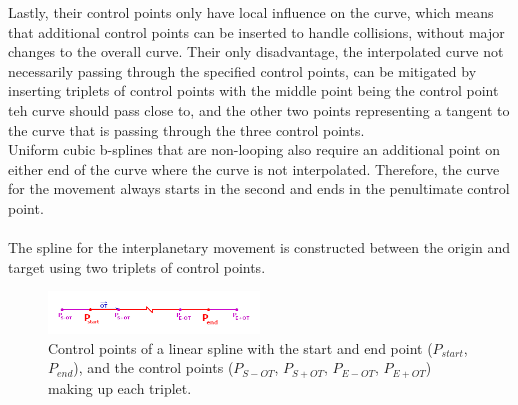 Lastly, their control points only have local influence on the curve, which means that additional control points can
be inserted to handle collisions, without major changes to the overall curve.
Their only disadvantage, the interpolated curve not necessarily passing through the specified control points, can be
mitigated by inserting triplets of control points with the middle point being the control point teh curve should pass
close to, and the other two points representing a tangent to the curve that is passing through the three control points.
\\
Uniform cubic b-splines that are non-looping also require an additional point on either end of the curve where the
curve is not interpolated.
Therefore, the curve for the movement always starts in the second and ends in the penultimate control point.
\\
\\
The spline for the interplanetary movement is constructed between the origin and target using two triplets of control
points.

\begin{figure}[h]
    \centering
    \includegraphics[width=0.5\textwidth]{content/4_3_autoNavigation/img/LinearSplinePoints}
    \caption{Control points of a linear spline with the start and end point ($P_{start}$, $P_{end}$), and the control
    points ($P_{S-OT}$, $P_{S+OT}$, $P_{E-OT}$, $P_{E+OT}$) making up each triplet.}
    \label{fig:linear-control-points}
\end{figure}

